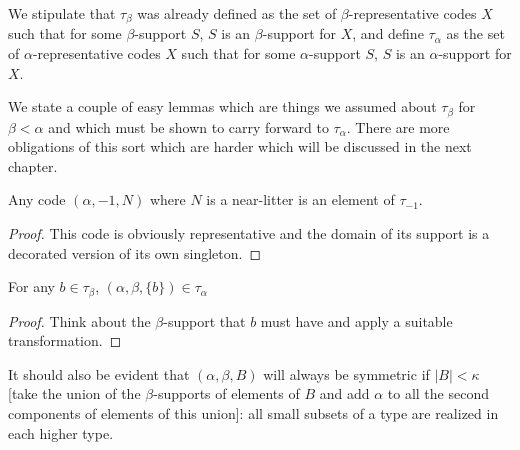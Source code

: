 \begin{definition}
\label {def:tau-alpha}
We stipulate that $\tau_\beta$ was already defined as the set of $\beta$-representative codes $X$ such that for some $\beta$-support $S$,
$S$ is an $\beta$-support for $X$,  and define $\tau_\alpha$ as the set of $\alpha$-representative codes $X$ such that for some $\alpha$-support $S$,
$S$ is an $\alpha$-support for $X$.
\end{definition}

We state a couple of easy lemmas which are things we assumed about $\tau_\beta$ for $\beta<\alpha$ and which must be shown to carry forward to $\tau_\alpha$.  There are more obligations of this sort which are harder which will be discussed in the next chapter.

\begin{lemma}
\label {def:near-litter-obligation}
Any code $(\alpha,-1,N)$ where $N$ is a near-litter is an element of $\tau_{-1}$.
\end{lemma}

\begin{proof}
This code is obviously representative and the domain of its support is a decorated version of its own singleton.
\end{proof}

\begin{lemma}
\label {def:singleton-obligation}
For any $b \in \tau_\beta$, $(\alpha,\beta,\{b\}) \in \tau_\alpha$
\end{lemma}

\begin{proof}
Think about the $\beta$-support that $b$ must have and apply a suitable transformation.
\end{proof}

\begin{lemma}
\label {lem:small-subsets-closure}
It should also be evident that $(\alpha,\beta,B)$ will always be symmetric if $|B|<\kappa$ [take the union of the $\beta$-supports of elements of $B$ and add $\alpha$ to all the second components of elements of this union]:  all small subsets of a type are realized in each higher type.
\end{lemma}

